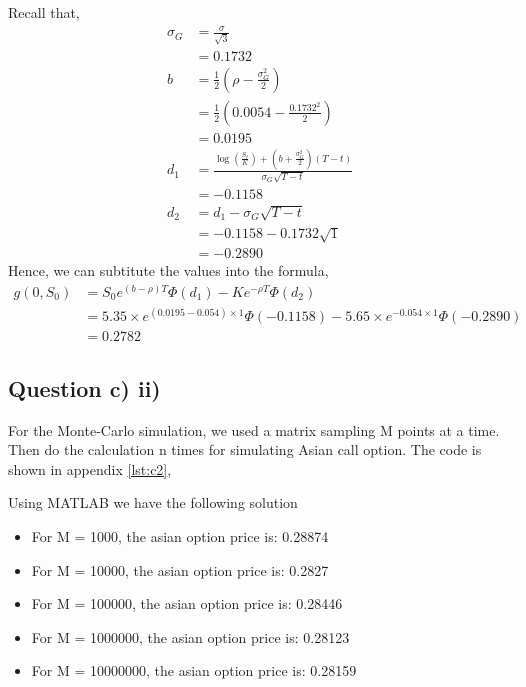 \documentclass[12pt]{article}
\begin{document}
Recall that,
\[
    \begin{aligned}
        \sigma_G & =\frac{\sigma}{\sqrt{3}}                           \\
                 & =0.1732                                            \\
        b        & =\frac{1}{2}\left(\rho-\frac{\sigma_G^2}{2}\right) \\
                 & =\frac{1}{2}\left(0.0054-\frac{0.1732^2}{2}\right) \\
                 & =0.0195                                            \\
        d_1      & =\frac{\log\left(\frac{S_t}{K}\right)+\left(b+\frac{\sigma_G^2}{2}\right)(T-t)}{\sigma_G\sqrt{T-t}}\\
                 & =-0.1158                                           \\
        d_2      & =d_1-\sigma_G \sqrt{T-t}                           \\
                 & =-0.1158-0.1732 \sqrt{1}                           \\
                 & =-0.2890
    \end{aligned}
\]
Hence, we can subtitute the values into the formula,
\[
    \begin{aligned}
        g\left(0, S_0\right) & =S_0 e^{(b-\rho)T}
        \Phi\left(d_1\right)-K e^{-\rho T} \Phi\left(d_2\right)                                   \\
                             & =5.35 \times e^{(0.0195-0.054) \times 1} \Phi(-0.1158)-5.65 \times
        e^{-0.054 \times 1} \Phi(-0.2890)                                                         \\
                             & =0.2782
    \end{aligned}
\]

\subsection{Question c) ii)}

For the Monte-Carlo simulation, we used a matrix sampling M points at a time.
Then do the calculation n times for simulating Asian call option. The code is
shown in appendix \ref{lst:c2},

Using MATLAB we have the following solution

\begin{itemize}
    \item For M = 1000, the asian option price is: 0.28874
    \item For M = 10000, the asian option price is: 0.2827
    \item For M = 100000, the asian option price is: 0.28446
    \item For M = 1000000, the asian option price is: 0.28123
    \item For M = 10000000, the asian option price is: 0.28159
\end{itemize}
\end{document}
